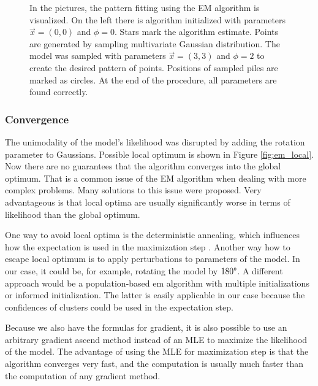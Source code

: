 \begin{figure}[H]
\begin{subfigure}{.49\textwidth}
	\end{subfigure}
	
	\caption[EM pattern fitting]{In the pictures, the pattern fitting using the EM algorithm is visualized. On the left there is algorithm initialized with parameters $\vec{x}=(0, 0)$ and $\phi=0$. Stars mark the algorithm estimate. Points are generated by sampling multivariate Gaussian distribution. The model was sampled with parameters $\vec{x}=(3, 3)$ and $\phi=2$ to create the desired pattern of points. Positions of sampled piles are marked as circles. At the end of the procedure, all parameters are found correctly.}
	\label{fig:em_pattern}
\end{figure}

\subsubsection{Convergence}
The unimodality of the model's likelihood was disrupted by adding the rotation parameter to Gaussians. Possible local optimum is shown in Figure \ref{fig:em_local}. Now there are no guarantees that the algorithm converges into the global optimum. That is a common issue of the EM algorithm when dealing with more complex problems. Many solutions to this issue were proposed. Very advantageous is that local optima are usually significantly worse in terms of likelihood than the global optimum. 

One way to avoid local optima is the deterministic annealing, which influences how the expectation is used in the maximization step \cite{ueda1998}. Another way how to escape local optimum is to apply perturbations to parameters of the model. In our case, it could be, for example, rotating the model by $180\degree$. A different approach would be a population-based em algorithm with multiple initializations or informed initialization. The latter is easily applicable in our case because the confidences of clusters could be used in the expectation step. 

Because we also have the formulas for gradient, it is also possible to use an arbitrary gradient ascend method instead of an MLE to maximize the likelihood of the model. The advantage of using the MLE for maximization step is that the algorithm converges very fast, and the computation is usually much faster than the computation of any gradient method.

